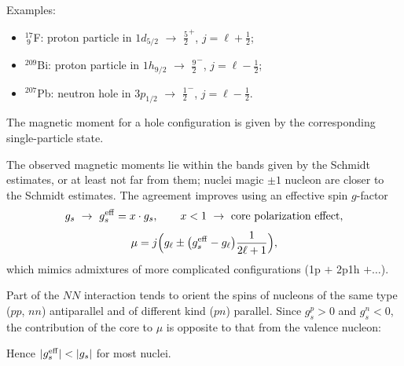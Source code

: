 \documentclass[11pt,a4paper]{article}
\begin{document}
Examples:
\begin{itemize}
\item ${}^{17}_{\ 9}$F: proton particle in $1d_{5/2}$ $\to$ $\frac52^+$, $j=\ell+\frac12$;
\item ${}^{209}$Bi: proton particle in $1h_{9/2}$ $\to$ $\frac92^-$, $j=\ell-\frac12$;
\item ${}^{207}$Pb: neutron hole in $3p_{1/2}$ $\to$ $\frac12^-$, $j=\ell-\frac12$.
\end{itemize}
The magnetic moment for a hole configuration is given by the corresponding single-particle state.

The observed magnetic moments lie within the bands given by the Schmidt estimates, or at least not far from them; nuclei magic $\pm1$ nucleon are closer to the Schmidt estimates. The agreement improves using an effective spin $g$-factor
\[
g_s\ \to\ g_s^{\rm eff}=x\cdot g_s,\qquad x<1\ \to\ \text{core polarization effect},
\]
\[
\mu=j\Big(g_\ell\pm\big(g_s^{\rm eff}-g_\ell\big)\frac{1}{2\ell+1}\Big),
\]
which mimics admixtures of more complicated configurations (1p $+$ 2p1h $+\dots$).

Part of the $NN$ interaction tends to orient the spins of nucleons of the same type ($pp$, $nn$) antiparallel and of different kind ($pn$) parallel. Since $g_s^p>0$ and $g_s^n<0$, the contribution of the core to $\mu$ is opposite to that from the valence nucleon:
\begin{center}
\end{center}
Hence $|g_s^{\rm eff}|<|g_s|$ for most nuclei.
\end{document}
